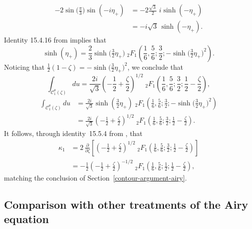 \documentclass{article}
\theoremstyle{definition}
\theoremstyle{plain}
\newenvironment{verify}{\color{ForestGreen}}{\color{black}}
\begin{document}
\begin{verify}
\begin{align*}
-2 \sin\big(\tfrac{\pi}{3}\big) \sin(-i\eta_+) & = -2 \tfrac{\sqrt{3}}{2}\;i\sinh(-\eta_+) \\
& = -i\sqrt{3}\,\sinh(-\eta_+).
\end{align*}
\end{verify}
Identity 15.4.16 from \cite{dlmf} implies that
\[ \sinh(\eta_+) = \frac{2}{3} \sinh\big(\tfrac{3}{2}\eta_+\big)\;{}_2 F_1\left(\frac{1}{6}, \frac{5}{6}; \frac{3}{2}; -\sinh\big(\tfrac{3}{2}\eta_+\big)^2\right). \]
Noticing that $\tfrac{1}{2}(1 - \zeta) = -\sinh\big(\tfrac{3}{2}\eta_+\big)^2$, we conclude that
\[ \int_{\mathcal{C}_1^\theta(\zeta)} du = \frac{2i}{\sqrt{3}} \left(-\frac{1}{2} + \frac{\zeta}{2}\right)^{1/2}\;{}_2 F_1\left(\frac{1}{6}, \frac{5}{6}; \frac{3}{2}; \frac{1}{2} - \frac{\zeta}{2}\right), \]
\begin{verify}
\begin{align*}
\int_{\mathcal{C}_1^\theta(\zeta)} du & = \frac{2i}{\sqrt{3}} \sinh\left(\frac{3}{2}\eta_+\right)\;{}_2 F_1\left(\frac{1}{6}, \frac{5}{6}; \frac{3}{2}; -\sinh\big(\tfrac{3}{2}\eta_+\big)^2\right) \\
& = \frac{2i}{\sqrt{3}} \left(-\frac{1}{2} + \frac{\zeta}{2}\right)^{1/2}\;{}_2 F_1\left(\frac{1}{6}, \frac{5}{6}; \frac{3}{2}; \frac{1}{2} - \frac{\zeta}{2}\right).
\end{align*}
\end{verify}
It follows, through identity~15.5.4 from \cite{dlmf}, that
\begin{align*}
\kappa_1 & = 2\,\frac{\partial}{\partial \zeta} \left[ \left(-\frac{1}{2} + \frac{\zeta}{2}\right)^{1/2}\;{}_2 F_1\left(\frac{1}{6}, \frac{5}{6}; \frac{3}{2}; \frac{1}{2} - \frac{\zeta}{2}\right) \right] \\
& = -\frac{1}{2} \left(-\frac{1}{2} + \frac{\zeta}{2}\right)^{-1/2}\;{}_2 F_1\left(\frac{1}{6}, \frac{5}{6}; \frac{1}{2}; \frac{1}{2} - \frac{\zeta}{2}\right),
\end{align*}
matching the conclusion of Section~\ref{contour-argument-airy}.
%
\subsection{Comparison with other treatments of the Airy equation}\label{airy-comparison}
%
\end{document}
